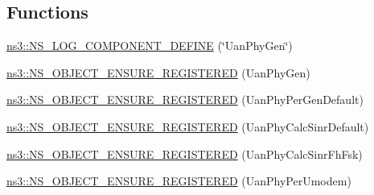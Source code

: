 \subsection*{Functions}
\begin{DoxyCompactItemize}
\item 
\hyperlink{namespacens3_a8d0a6127518dd5c22b68b07527e35f98}{ns3\+::\+N\+S\+\_\+\+L\+O\+G\+\_\+\+C\+O\+M\+P\+O\+N\+E\+N\+T\+\_\+\+D\+E\+F\+I\+NE} (\char`\"{}Uan\+Phy\+Gen\char`\"{})
\item 
\hyperlink{namespacens3_a7f2a3370e9c59f87f515772676b6093d}{ns3\+::\+N\+S\+\_\+\+O\+B\+J\+E\+C\+T\+\_\+\+E\+N\+S\+U\+R\+E\+\_\+\+R\+E\+G\+I\+S\+T\+E\+R\+ED} (Uan\+Phy\+Gen)
\item 
\hyperlink{namespacens3_a17bc0d98e3a5eeb46f179e7ffdcf455c}{ns3\+::\+N\+S\+\_\+\+O\+B\+J\+E\+C\+T\+\_\+\+E\+N\+S\+U\+R\+E\+\_\+\+R\+E\+G\+I\+S\+T\+E\+R\+ED} (Uan\+Phy\+Per\+Gen\+Default)
\item 
\hyperlink{namespacens3_a1473e8675aac346714373624c285a6be}{ns3\+::\+N\+S\+\_\+\+O\+B\+J\+E\+C\+T\+\_\+\+E\+N\+S\+U\+R\+E\+\_\+\+R\+E\+G\+I\+S\+T\+E\+R\+ED} (Uan\+Phy\+Calc\+Sinr\+Default)
\item 
\hyperlink{namespacens3_a22390c3408048ff07ada841aaddb6a15}{ns3\+::\+N\+S\+\_\+\+O\+B\+J\+E\+C\+T\+\_\+\+E\+N\+S\+U\+R\+E\+\_\+\+R\+E\+G\+I\+S\+T\+E\+R\+ED} (Uan\+Phy\+Calc\+Sinr\+Fh\+Fsk)
\item 
\hyperlink{namespacens3_af72686821bccd707fe21f6453a108867}{ns3\+::\+N\+S\+\_\+\+O\+B\+J\+E\+C\+T\+\_\+\+E\+N\+S\+U\+R\+E\+\_\+\+R\+E\+G\+I\+S\+T\+E\+R\+ED} (Uan\+Phy\+Per\+Umodem)
\end{DoxyCompactItemize}
